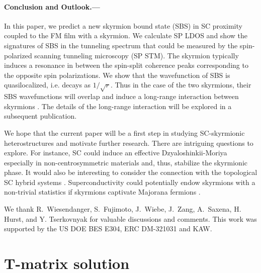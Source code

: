\documentclass[twocolumn,showpacs,floatfix,longbibliography]{revtex4-1}
\begin{document}
\paragraph*{Conclusion and Outlook.---} \label{sec:conclusion}

In this paper, we predict a new skyrmion bound state (SBS) in SC proximity coupled to the FM film with a skyrmion. We calculate SP LDOS and show the signatures of SBS in the tunneling spectrum that could be measured by the spin-polarized scanning tunneling microscopy (SP STM). The skyrmion typically induces a resonance in between the spin-split coherence peaks corresponding to the opposite spin polarizations. We show that the wavefunction of SBS is quasilocalized, i.e. decays as $1/\sqrt{r}$. Thus in the case of the two skyrmions, their SBS wavefunctions will overlap and induce a long-range interaction between skyrmions \cite{Yao2014,Menard2015}. The details of the long-range interaction will be explored in a subsequent publication.

We hope that the current paper will be a first step in studying SC-skyrmionic heterostructures and motivate further research. There are intriguing questions to explore. For instance, SC could induce an effective Dzyaloshinkii-Moriya especially in non-centrosymmetric materials and, thus, stabilize the skyrmionic phase. It would also be interesting to consider the connection with the topological SC hybrid systems \cite{Alicea2012}. Superconductivity could potentially endow skyrmions with a non-trivial statistics if skyrmions captivate Majorana fermions \cite{Kim2015}.

We thank  R.~Wiesendanger, S.~Fujimoto, J.~Wiebe, J.~Zang, A.~Saxena, H. Hurst, and Y. Tserkovnyak for valuable discussions and comments. This work was supported by the US DOE BES E304, ERC DM-321031 and KAW.

\newpage




\appendix

\section{T-matrix solution} \label{sec:appendixTMatrix}
\end{document}
